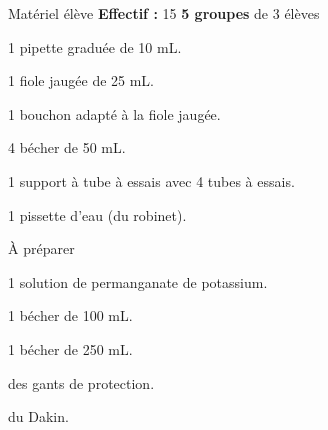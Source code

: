 
\begin{boiteMateriel}{Matériel élève}
  \textbf{Effectif :} 15
  \qq{}\qq{}
  \flecheLongue \textbf{5 groupes} de 3 élèves

  \begin{protocole}
    \item 1 pipette graduée de 10 mL.
    \item 1 fiole jaugée de 25 mL.
    \item 1 bouchon adapté à la fiole jaugée.
    \item 4 bécher de 50 mL.
    \item 1 support à tube à essais avec 4 tubes à essais.
    \item 1 pissette d'eau (du robinet).
  \end{protocole}
\end{boiteMateriel}


\begin{boiteMateriel}{À préparer}
  \begin{protocole}
    \item 1 solution de permanganate de potassium.
    \item 1 bécher de 100 mL.
    \item 1 bécher de 250 mL.
    \item des gants de protection.
    \item du Dakin.
  \end{protocole}
\end{boiteMateriel}